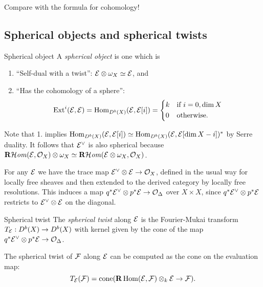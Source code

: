 Compare with the formula for cohomology!


\subsection{Spherical objects and spherical twists}

\begin{definition}{Spherical object}{}
    A \emph{spherical object} is one which is
    \begin{enumerate}
        \item ``Self-dual with a twist'': $\mathcal{E}\otimes\omega_X\simeq\mathcal{E}$, and
        \item ``Has the cohomology of a sphere'':
            \begin{equation*}
                \Ext^i(\calE,\calE)
                    = \Hom_{D^b(X)}(\calE,\calE[i])
                    = \begin{cases*}
                        k & if $i=0,\dim X$ \\
                        0 & otherwise.
                    \end{cases*}
            \end{equation*}
    \end{enumerate}
\end{definition}

Note that 1. implies $\operatorname{Hom}_{D^b(X)}(\mathcal{E},\mathcal{E}[i])\simeq\operatorname{Hom}_{D^b(X)}(\mathcal{E},\mathcal{E}[\dim X-i])^*$
by Serre duality. It follows that $\mathcal{E}^\vee$ is also spherical because
$\operatorname{\mathbf{R}\mathcal{H}\mathit{om}}(\mathcal{E},\mathcal{O}_X)\otimes\omega_X\simeq\operatorname{\mathbf{R}\mathcal{H}\mathit{om}}(\mathcal{E}\otimes\omega_X,\mathcal{O}_X)$.

For any $\mathcal{E}$ we have the trace map $\mathcal{E}^\vee\otimes\mathcal{E}\to\mathcal{O}_X$, defined
in the usual way for locally free sheaves and then extended to the derived
category by locally free resolutions. This induces a map
$q^*\mathcal{E}^\vee\otimes p^*\mathcal{E}\to\mathcal{O}_\Delta$ over $X\times X$, since
$q^*\mathcal{E}^\vee\otimes p^*\mathcal{E}$ restricts to $\mathcal{E}^\vee\otimes\mathcal{E}$ on the
diagonal.

\begin{definition}{Spherical twist}{}
    The \emph{spherical twist} along $\mathcal{E}$ is the Fourier-Mukai transform
    $T_{\mathcal{E}}:D^b(X)\to D^b(X)$ with kernel given by the cone of the map
    $q^*\mathcal{E}^\vee\otimes p^*\mathcal{E}\to\mathcal{O}_\Delta$.
\end{definition}

\begin{proposition}[label=prop:twistformula]{}{}
    The spherical twist of $\mathcal{F}$ along $\mathcal{E}$ can be computed as the cone on
    the evaluation map:
    \begin{equation}\label{eqn:twistformula}
        T_{\mathcal{E}}(\mathcal{F})=\operatorname{cone}(\operatorname{\mathbf{R}}\operatorname{Hom}(\mathcal{E},\mathcal{F})\otimes_k\mathcal{E}\to\mathcal{F}).
    \end{equation}
\end{proposition}

